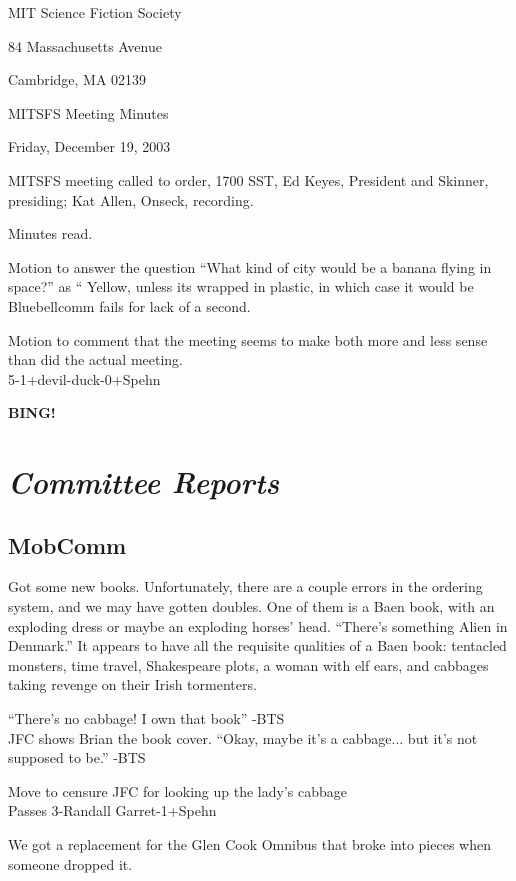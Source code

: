 \documentclass[10pt]{article}
\newcommand{\bing}{{\bf BING!} }
\newcommand{\goto}[1]{\bing \vskip 12pt \section*{{\em{#1}}}}
\begin{document}
\begin{center}

MIT Science Fiction Society 

84 Massachusetts Avenue

Cambridge, MA 02139

\vspace{12pt}

MITSFS Meeting Minutes 

Friday, December 19, 2003

\end{center}
 
\vspace{18pt}

\setlength{\parskip}{6pt}

\noindent
MITSFS meeting called to order, 1700 SST, Ed Keyes, President and
Skinner, presiding; Kat Allen,  Onseck, recording.

Minutes read.

Motion to answer the question ``What kind of city would be a banana
flying in space?'' as ``
Yellow, unless its wrapped in plastic, in which case it would be
Bluebellcomm fails for lack of a second.

Motion to comment that the meeting seems to make both more and less
sense than did the actual meeting.\\
5-1+devil-duck-0+Spehn



\goto{Committee Reports}
\subsection*{MobComm}
Got some new books.  Unfortunately, there are a couple errors in the
ordering system, and we may have gotten doubles. One of them is a Baen
book, with an exploding dress or maybe an exploding horses' head.
``There's something Alien in Denmark.'' It appears to have all the
requisite qualities of a Baen book: tentacled monsters, time travel,
Shakespeare plots, a woman with elf ears, and cabbages taking revenge
on their Irish tormenters.

``There's no cabbage! I own that book'' -BTS\\
JFC shows Brian the book cover. 
``Okay, maybe it's a cabbage... but it's not supposed to be.'' -BTS

Move to censure JFC for looking up the lady's cabbage\\
Passes 3-Randall Garret-1+Spehn

We got a replacement for the Glen Cook Omnibus that broke into pieces
when someone dropped it.
\end{document}
